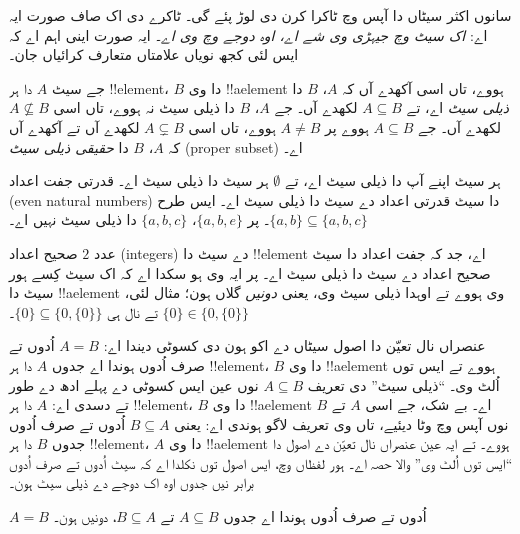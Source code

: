 \documentclass[../../../include/open-logic-section]{subfiles}
\begin{document}

\begin{explain}
سانوں اکثر سیٹاں دا آپس وچ ٹاکرا کرن دی لوڑ پئے گی۔ ٹاکرے دی اک صاف صورت
ایہ اے: \emph{اک سیٹ وچ جیہڑی وی شے اے، اوہ دوجے وچ وی اے}۔ ایہ صورت اینی
اہم اے کہ ایس لئی کجھ نویاں علامتاں متعارف کرائیاں جان۔
\end{explain}

\begin{defn}
جے سیٹ $A$ دا ہر !!{element}، $B$ دا وی !!a{element} ہووے، تاں اسی آکھدے آں
کہ $A$، $B$ دا \emph{ذیلی سیٹ} اے، تے $A \subseteq B$ لکھدے آں۔ جے
$A$، $B$ دا ذیلی سیٹ نہ ہووے، تاں اسی $A \not\subseteq B$ لکھدے آں۔
جے $A \subseteq B$ ہووے پر $A \neq B$ ہووے، تاں اسی $A \subsetneq B$
لکھدے آں تے آکھدے آں کہ $A$، $B$ دا \emph{حقیقی ذیلی سیٹ}
(proper subset) اے۔
\end{defn}

\begin{ex}
ہر سیٹ اپنے آپ دا ذیلی سیٹ اے، تے $\emptyset$ ہر سیٹ دا ذیلی سیٹ اے۔ قدرتی
جفت اعداد (even natural numbers) دا سیٹ قدرتی اعداد دے سیٹ دا ذیلی سیٹ اے۔
ایس طرح
$\{ a, b \} \subseteq \{ a, b, c \}$۔ پر $\{ a, b, e \}$،
$\{ a, b, c \}$ دا ذیلی سیٹ نہیں اے۔
\end{ex}

\begin{ex}
عدد $2$ صحیح اعداد (integers) دے سیٹ دا !!{element} اے، جد کہ جفت اعداد دا
سیٹ صحیح اعداد دے سیٹ دا ذیلی سیٹ اے۔ پر ایہ وی ہو سکدا اے کہ اک سیٹ کِسے ہور سیٹ
دا !!a{element} وی ہووے تے اوہدا ذیلی سیٹ وی، یعنی \emph{دونیں} گلاں ہون؛
مثال لئی، $\{0\} \in \{0, \{0\}\}$ تے نال ہی
$\{0\} \subseteq \{0, \{0\}\}$۔
\end{ex}

عنصراں نال تعیّن دا اصول سیٹاں دے اکو ہون دی کسوٹی دیندا اے: $A = B$ اُدوں
تے صرف اُدوں ہوندا اے جدوں $A$ دا ہر !!{element}، $B$ دا وی !!a{element}
ہووے تے ایس توں اُلٹ وی۔ ``ذیلی سیٹ'' دی تعریف $A \subseteq B$ نوں عین ایس
کسوٹی دے پہلے ادھ دے طور تے دسدی اے: $A$ دا ہر !!{element}، $B$ دا وی
!!a{element} اے۔ بے شک، جے اسی $A$ تے $B$ نوں آپس وچ وٹا دیئیے، تاں وی
تعریف لاگو ہوندی اے: یعنی $B \subseteq A$ اُدوں تے صرف اُدوں جدوں $B$ دا
ہر !!{element}، $A$ دا وی !!a{element} ہووے۔ تے ایہ عین عنصراں نال تعیّن
دے اصول دا ``ایس توں اُلٹ وی'' والا حصہ اے۔ ہور لفظاں وچ، ایس اصول توں
نکلدا اے کہ سیٹ اُدوں تے صرف اُدوں برابر نیں جدوں اوہ اک دوجے دے ذیلی سیٹ ہون۔

\begin{prop}
$A = B$ اُدوں تے صرف اُدوں ہوندا اے جدوں $A \subseteq B$ تے
$B \subseteq A$، دونیں ہون۔
\end{prop}
\end{document}
